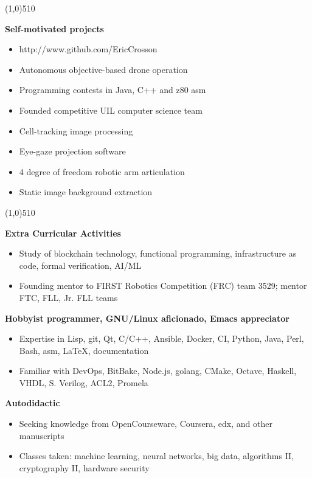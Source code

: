 \documentclass{report}
\newcommand{\cut}{\begin{center} \line(1,0){510} \end{center}}
\begin{document}
\cut{}

\textbf{Self-motivated projects}
\begin{paracol}{2}

  \begin{itemize}[label=$\circ$]
  \item http://www.github.com/EricCrosson
  \item Autonomous objective-based drone operation
  \item Programming contests in Java, C++ and z80 asm
  \item Founded competitive UIL computer science team
  \end{itemize}

  \switchcolumn{}
  \begin{itemize}[label=$\circ$]
  \item Cell-tracking image processing
  \item Eye-gaze projection software
  \item 4 degree of freedom robotic arm articulation
  \item Static image background extraction
  \end{itemize}
\end{paracol}

\cut{}

\textbf{Extra Curricular Activities}
\begin{itemize}[label=$\circ$]
\item Study of blockchain technology, functional programming, infrastructure as code, formal verification, AI/ML
\item Founding mentor to FIRST Robotics Competition (FRC) team 3529; mentor FTC,
  FLL, Jr. FLL teams
\end{itemize}

\textbf{Hobbyist programmer, GNU/Linux aficionado, Emacs appreciator}
\begin{itemize}[label=$\circ$]
\item Expertise in Lisp, git, Qt, C/C++, Ansible, Docker, CI, Python, Java, Perl, Bash, asm,
  \LaTeX{}, documentation
\item Familiar with DevOps, BitBake, Node.js, golang, CMake, Octave, Haskell, VHDL, S. Verilog, ACL2, Promela
\end{itemize}

\textbf{Autodidactic}
\begin{itemize}[label=$\circ$]
\item Seeking knowledge from OpenCourseware, Coursera, edx, and other manuscripts
\item Classes taken: machine learning, neural networks, big data, algorithms II,
  cryptography II, hardware security
\end{itemize}


\end{document}
